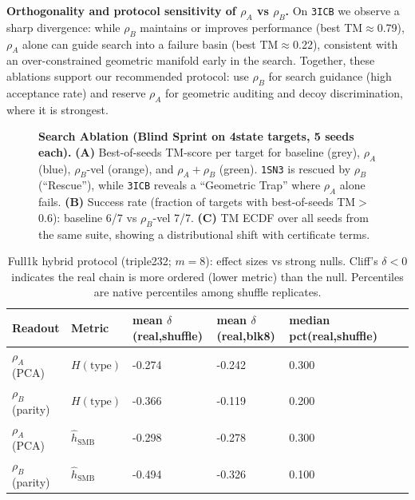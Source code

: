 \textbf{Orthogonality and protocol sensitivity of $\rho_A$ vs $\rho_B$.}
On \texttt{3ICB} we observe a sharp divergence: while $\rho_B$ maintains or improves performance (best TM$\approx$0.79), $\rho_A$ alone can guide search into a failure basin (best TM$\approx$0.22), consistent with an over-constrained geometric manifold early in the search. Together, these ablations support our recommended protocol: use $\rho_B$ for search guidance (high acceptance rate) and reserve $\rho_A$ for geometric auditing and decoy discrimination, where it is strongest.

\begin{figure}[t]
  \centering
  \caption{\textbf{Search Ablation (Blind Sprint on 4state targets, 5 seeds each).}
  \textbf{(A)} Best-of-seeds TM-score per target for baseline (grey), $\rho_A$ (blue), $\rho_B$-vel (orange), and $\rho_A+\rho_B$ (green). \texttt{1SN3} is rescued by $\rho_B$ (``Rescue''), while \texttt{3ICB} reveals a ``Geometric Trap'' where $\rho_A$ alone fails.
  \textbf{(B)} Success rate (fraction of targets with best-of-seeds TM$>$0.6): baseline 6/7 vs $\rho_B$-vel 7/7.
  \textbf{(C)} TM ECDF over all seeds from the same suite, showing a distributional shift with certificate terms.
  }
  \label{fig:blind_sprint_ablation}
\end{figure}

\begin{table}[t]
  \centering
  \caption{Full1k hybrid protocol (triple232; $m=8$): effect sizes vs strong nulls. Cliff's $\delta<0$ indicates the real chain is more ordered (lower metric) than the null. Percentiles are native percentiles among shuffle replicates.}
  \label{tab:auric_full1k}
  \begin{tabular}{lllllll}
    \toprule
    Readout & Metric & mean $\delta$(real,shuffle) & mean $\delta$(real,blk8) & median pct(real,shuffle) \\
    \midrule
    $\rho_A$ (PCA) & $H(\mathrm{type})$ & -0.274 & -0.242 & 0.300 \\
    $\rho_B$ (parity) & $H(\mathrm{type})$ & -0.366 & -0.119 & 0.200 \\
    $\rho_A$ (PCA) & $\widehat{h}_{\mathrm{SMB}}$ & -0.298 & -0.278 & 0.300 \\
    $\rho_B$ (parity) & $\widehat{h}_{\mathrm{SMB}}$ & -0.494 & -0.326 & 0.100 \\
    \bottomrule
  \end{tabular}
\end{table}

